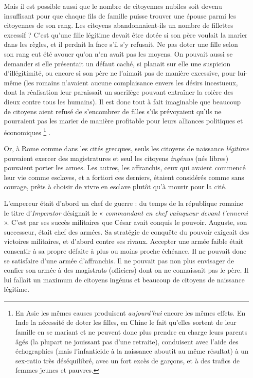  Mais il est possible aussi que le nombre de citoyennes nubiles soit devenu insuffisant pour que chaque fils de famille puisse trouver une épouse parmi les citoyennes de son rang. Les citoyens abandonnaient-ils un nombre de fillettes excessif ? C'est qu'une fille légitime devait être dotée si son père voulait la marier dans les règles, et il perdait la face s'il s'y refusait. Ne pas doter une fille selon son rang eut été avouer qu'on n'en avait pas les moyens. On pouvait aussi se demander si elle présentait un défaut caché, si planait sur elle une suspicion d'illégitimité, ou encore si son père ne l'aimait pas de manière excessive, pour lui-même (les romains n'avaient aucune complaisance envers les désirs incestueux, dont la réalisation leur paraissait un sacrilège pouvant entraîner la colère des dieux contre tous les humains). Il est donc tout à fait imaginable que beaucoup de citoyens aient refusé de s'encombrer de filles s'ils prévoyaient qu'ils ne pourraient pas les marier de manière profitable pour leurs alliances politiques et économiques%
\footnote{En Asie les mêmes causes produisent \emph{aujourd'hui} encore les mêmes effets. En Inde la nécessité de doter les filles, en Chine le fait qu'elles sortent de leur famille en se mariant et ne peuvent donc plus prendre en charge leurs parents âgés (la plupart ne jouissant pas d'une retraite), conduisent avec l'aide des échographies (mais l'infanticide à la naissance aboutit au même résultat) à un sex-ratio très déséquilibré, avec un fort excès de garçons, et à des trafics de femmes jeunes et pauvres.}%
. 

 Or, à Rome comme dans les cités grecques, seuls les citoyens de naissance \emph{légitime} pouvaient exercer des magistratures et seul les citoyens \emph{ingénus} (nés libres) pouvaient porter les armes. Les autres, les affranchis, ceux qui avaient commencé leur vie comme esclaves, et a fortiori ces derniers, étaient considérés comme sans courage, prêts à choisir de vivre en esclave plutôt qu'à mourir pour la cité. 

 L'empereur était d'abord un chef de guerre : du temps de la république romaine le titre d'\emph{Imperator} désignait le « \emph{commandant en chef vainqueur devant l'ennemi} ». C'est par ses succès militaires que César avait conquis le pouvoir. Auguste, son successeur, était chef des armées. Sa stratégie de conquête du pouvoir exigeait des victoires militaires, et d'abord contre ses rivaux. Accepter une armée faible était consentir à sa propre défaite à plus ou moins proche échéance. Il ne pouvait donc se satisfaire d'une armée d'affranchis. Il ne pouvait pas non plus envisager de confier son armée à des magistrats (officiers) dont on ne connaissait pas le père. Il lui fallait un maximum de citoyens ingénus et beaucoup de citoyens de naissance légitime. 

